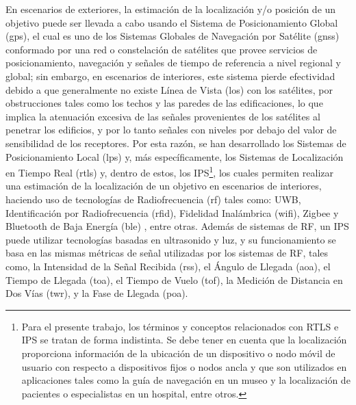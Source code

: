 En escenarios de exteriores, la estimación de la localización y/o posición de un objetivo puede ser llevada a cabo usando el Sistema de Posicionamiento Global (\gls{gps}), el cual es uno de los Sistemas Globales de Navegación por Satélite (\gls{gnss}) conformado por una red o constelación de satélites que provee servicios de posicionamiento, navegación y señales de tiempo de referencia a nivel regional y global; sin embargo, en escenarios de interiores, este sistema pierde efectividad debido a que generalmente no existe Línea de Vista (\gls{los}) con los satélites, por obstrucciones tales como los techos y las paredes de las edificaciones, lo que implica la atenuación excesiva de las señales provenientes de los satélites al penetrar los edificios, y por lo tanto señales con niveles por debajo del valor de sensibilidad de los receptores. Por esta razón, se han desarrollado los Sistemas de Posicionamiento Local (\gls{lps}) y, más específicamente, los Sistemas de Localización en Tiempo Real  (\gls{rtls}) y, dentro de estos, los IPS\footnote{Para el presente trabajo, los términos y conceptos relacionados con RTLS e IPS se tratan de forma indistinta. 
%
Se debe tener en cuenta que la localización proporciona información de la ubicación de un dispositivo o nodo móvil de usuario con respecto a dispositivos fijos o nodos ancla y que son utilizados en aplicaciones tales como la guía de navegación en un museo y la localización de pacientes o especialistas en un hospital, entre otros.}, los cuales permiten realizar una estimación de la localización de un objetivo en escenarios de interiores, haciendo uso de tecnologías de Radiofrecuencia (\gls{rf}) tales como: UWB, Identificación por Radiofrecuencia (\gls{rfid}), Fidelidad Inalámbrica (\gls{wifi}), Zigbee y Bluetooth de Baja Energía (\gls{ble}) \cite{ref6, ref4}, entre otras. Además de sistemas de RF, un IPS puede utilizar tecnologías basadas en ultrasonido y luz, y su funcionamiento se basa en las mismas métricas de señal utilizadas por los sistemas de RF, tales como, la Intensidad de la Señal Recibida (\gls{rss}), el Ángulo de Llegada (\gls{aoa}), el Tiempo de Llegada (\gls{toa}), el Tiempo de Vuelo (\gls{tof}), la Medición de Distancia en Dos Vías (\gls{twr}), y la Fase de Llegada (\gls{poa}). 
%
